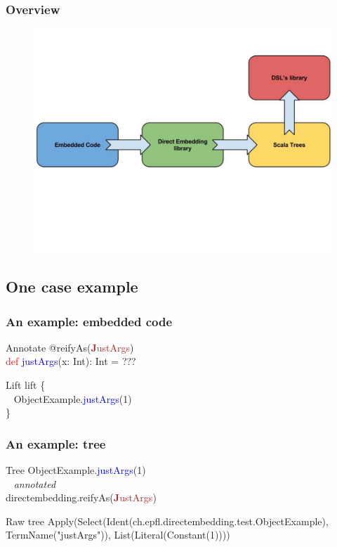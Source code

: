 \documentclass{beamer}
\newcommand{\TCR}{\textcolor{red}}
\newcommand{\TCB}{\textcolor{blue}}
\newcommand{\TCM}{\textcolor{brown}}
\begin{document}
\begin{frame}
\frametitle{Overview}
\begin{figure}
\includegraphics[width=0.8\linewidth]{./img/flow.jpg}
\end{figure}
\end{frame}

\subsection{One case example}

\begin{frame}
\frametitle{An example: embedded code}
\begin{block}{Annotate}
@reifyAs(\TCM{\textbf{J}ustArgs})\\
\TCR{def} \TCB{justArgs}(x: Int): Int = ???
\end{block}

\begin{block}{Lift}
lift \{\\
~ ObjectExample.\TCB{justArgs}(1)\\
\}
\end{block}

\end{frame}


\begin{frame}
\frametitle{An example: tree}
\begin{block}{Tree}
ObjectExample.\TCB{justArgs}(1)\\
~ \textit{annotated}\\
directembedding.reifyAs(\TCM{\textbf{J}ustArgs})\\
\end{block}

\begin{block}{Raw tree}
Apply(Select(Ident(ch.epfl.directembedding.test.ObjectExample), TermName("justArgs")), List(Literal(Constant(1))))
\end{block}

\end{frame}
\end{document}
